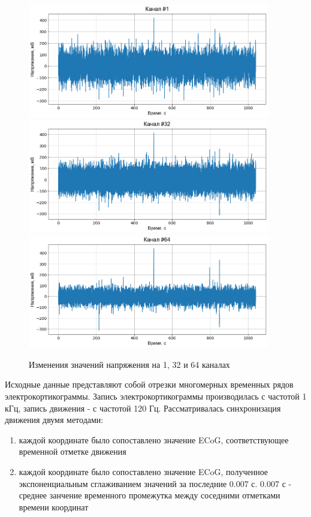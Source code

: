 \documentclass{mipt-thesis-bs}
\begin{document}
\begin{figure}[h]
\begin{center}
	\includegraphics[width=300pt,height=\textheight,keepaspectratio]{imgs/Raw_ch1.png}
	\includegraphics[width=300pt,height=\textheight,keepaspectratio]{imgs/Raw_ch32.png}
	\includegraphics[width=300pt,height=\textheight,keepaspectratio]{imgs/Raw_ch64.png}
	\caption{Изменения значений напряжения на 1, 32 и 64 каналах}	
	\label{fig:raw}
	\end{center}
\end{figure}

Исходные данные представляют собой отрезки многомерных временных рядов электрокортикограммы. Запись электрокортикограммы производилась с частотой 1 кГц, запись движения - с частотой 120 Гц.
Рассматривалась синхронизация движения двумя методами: 
\begin{enumerate}
\item каждой координате было сопоставлено значение ECoG, соответствующее временной отметке движения
\item каждой координате было сопоставлено значение ECoG, полученное экспоненциальным сглаживанием значений за последние 0.007 с. 0.007 с - среднее занчение временного промежутка между соседними отметками времени координат
\end{enumerate}
\end{document}
